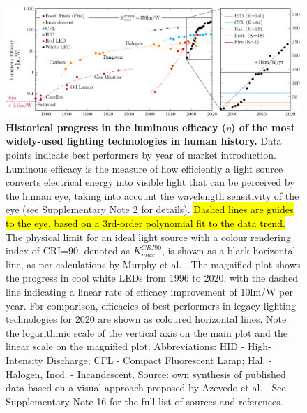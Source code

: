 \documentclass[parskip=full]{article}
\newcommand{\hlcolor}[2][yellow]{ {\sethlcolor{#1} \hl{#2}} }
\begin{document}
\begin{figure}[H]
 \centering
 \includegraphics[width=\textwidth]{figures/history_efficacy.pdf}
 \caption{\textbf{Historical progress in the luminous efficacy ($\eta$) of the most widely-used lighting technologies in human history.} Data points indicate best performers by year of market introduction. Luminous efficacy is the measure of how efficiently a light source converts electrical energy into visible light that can be perceived by the human eye, taking into account the wavelength sensitivity of the eye (see Supplementary Note 2 for details). \hlcolor[green]{Dashed lines are guides to the eye, based on a 3rd-order polynomial fit to the data trend.} The physical limit for an ideal light source with a colour rendering index of CRI=90, denoted as $K_{max}^{CRI90}$, is shown as a black horizontal line, as per calculations by Murphy et al. \cite{Murphy2012}. The magnified plot shows the progress in cool white LEDs from 1996 to 2020, with the dashed line indicating a linear rate of efficacy improvement of 10lm/W per year. For comparison, efficacies of best performers in legacy lighting technologies for 2020 are shown as coloured horizontal lines. Note the logarithmic scale of the vertical axis on the main plot and the linear scale on the magnified plot. Abbreviations: HID - High-Intensity Discharge; CFL - Compact Fluorescent Lamp; Hal. - Halogen, Incd. - Incandescent. Source: own synthesis of published data based on a visual approach proposed by Azevedo et al. \cite{azevedo2009transition}. See Supplementary Note 16 for the full list of sources and references.}
 \label{fgr:history_efficacy}
 \vspace{-7mm}
\end{figure}

\clearpage
\end{document}
